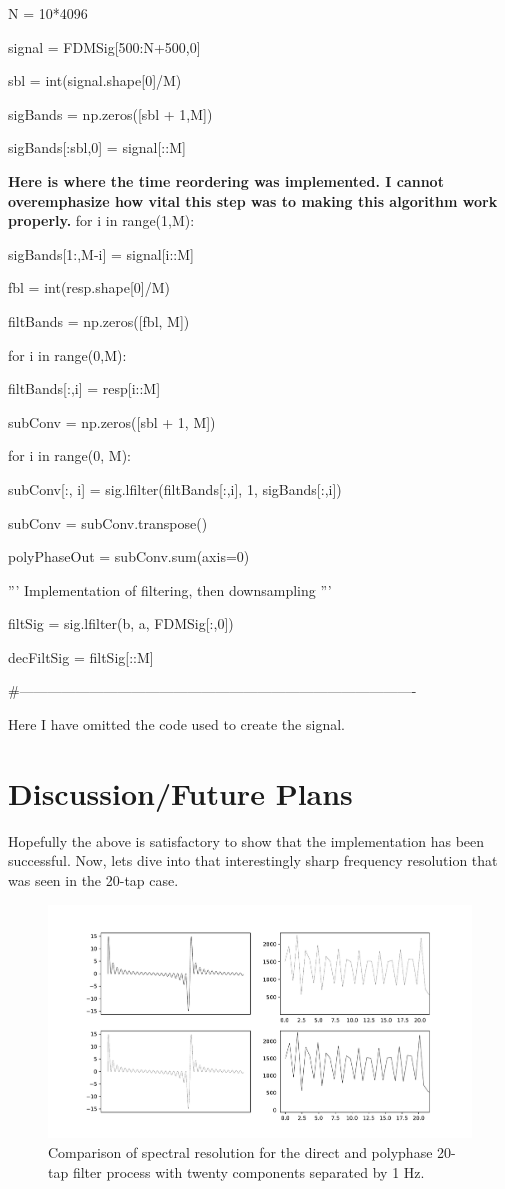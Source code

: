 \documentclass{report}
\begin{document}
N = 10*4096

signal = FDMSig[500:N+500,0] 

sbl = int(signal.shape[0]/M)

sigBands = np.zeros([sbl + 1,M])

sigBands[:sbl,0] = signal[::M]

\textbf{Here is where the time reordering was implemented.  I cannot overemphasize how vital this step was to making this algorithm work properly.  }
for i in range(1,M):

    sigBands[1:,M-i] = signal[i::M]


fbl = int(resp.shape[0]/M)

filtBands = np.zeros([fbl, M])

for i in range(0,M):

    filtBands[:,i] = resp[i::M]

    
subConv = np.zeros([sbl + 1, M])

for i in range(0, M):

    subConv[:, i] = sig.lfilter(filtBands[:,i], 1, sigBands[:,i])


subConv = subConv.transpose()

polyPhaseOut = subConv.sum(axis=0)

'''
Implementation of filtering, then downsampling
'''

filtSig = sig.lfilter(b, a, FDMSig[:,0])

decFiltSig = filtSig[::M]

\#-------------------------------------------------------------------------------------

Here I have omitted the code used to create the signal.

\section{Discussion/Future Plans}
Hopefully the above is satisfactory to show that the implementation has been successful.  Now, lets dive into that interestingly sharp frequency resolution that was seen in the 20-tap case.

\begin{figure}[ht]
\includegraphics[scale=.4]{Figure_15.pdf}
\caption{Comparison of spectral resolution for the direct and polyphase 20-tap filter process with twenty components separated by 1 Hz.}
\end{figure} 
\end{document}
